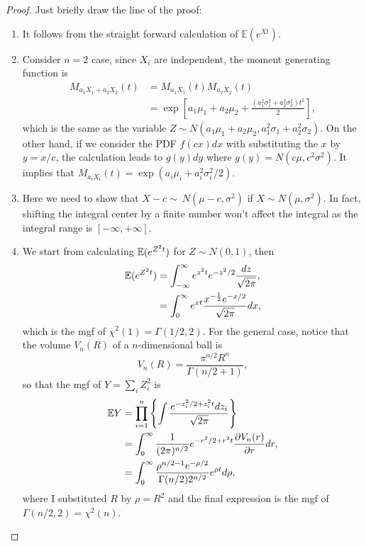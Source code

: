 \begin{proof} Just briefly draw the line of the proof:
	\begin{enumerate}
		\item It follows from the straight forward calculation of $\mathbb{E}(e^{Xt})$.
		\item Consider $n=2$ case, since $X_i$ are independent, the moment generating function is
		\begin{equation*}
		\begin{aligned}
		M_{a_1X_1+a_2X_2}(t)&=M_{a_1X_1}(t)M_{a_2X_2}(t)\\
		&=\exp\left[a_1\mu_1+a_2\mu_2+\frac{(a_1^2\sigma_1^2+a_2^2\sigma_2^2)t^2}{2}\right],
		\end{aligned}
		\end{equation*}
		which is the same as the variable $Z\sim N(a_1\mu_1+a_2\mu_2,a_1^2\sigma_1+a_2^2\sigma_2)$. On the other hand, if we consider the PDF $f(cx)dx$ with substituting the $x$ by $y=x/c$, the calculation leads to $g(y)dy$ where $g(y)=N(c\mu,c^2\sigma^2)$. It implies that $M_{a_iX_i}(t)=\exp(a_i\mu_i+a_i^2\sigma^2_i/2)$.
		\item Here we need to show that $X-c\sim~N(\mu-c,\sigma^2)$ if $X\sim N(\mu,\sigma^2)$. In fact, shifting the integral center by a finite number won't affect the integral as the integral range is $[-\infty,+\infty]$.
		\item We start from calculating $\mathbb{E}(e^{Z^2t})$ for $Z\sim N(0,1)$, then
		\begin{equation*}
		\begin{aligned}
		\mathbb{E}(e^{Z^2t})&=\int_{-\infty}^{\infty}e^{z^2t}e^{-z^2/2}\frac{dz}{\sqrt{2\pi}},\\
		&=\int_0^\infty e^{xt}\frac{x^{-\frac{1}{2}}e^{-x/2}}{\sqrt{2\pi}}dx,
		\end{aligned}
		\end{equation*}
		which is the mgf of $\chi^2(1)=\Gamma(1/2,2)$. For the general case, notice that the volume $V_n(R)$ of a $n$-dimensional ball is
		\begin{equation}
		V_n(R)=\frac{\pi^{n/2}R^n}{\Gamma(n/2+1)},
		\label{eq:nball_volume}
		\end{equation}
		so that the mgf of $Y=\sum_iZ_i^2$ is
		\begin{equation}
		\begin{aligned}
		\mathbb{E} Y &= \prod_{i=1}^n\left\{\int \frac{e^{-z_i^2/2+z^2_it}dz_i}{\sqrt{2\pi}}\right\}\\
		&=\int_0^{\infty}\frac{1}{(2\pi)^{n/2}}e^{-r^2/2+r^2t}\frac{\partial V_n(r)}{\partial r}dr,\\
		&=\int_0^\infty\frac{\rho^{n/2-1}e^{-\rho/2}}{\Gamma(n/2)2^{n/2}}e^{\rho t}d\rho,
		\end{aligned}
		\end{equation}
		where I substituted $R$ by $\rho=R^2$ and the final expression is the mgf of $\Gamma(n/2,2)=\chi^2(n)$.
	\end{enumerate}
\end{proof}


